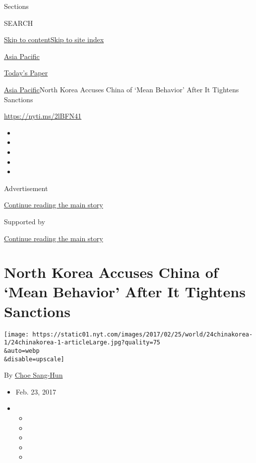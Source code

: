 Sections

SEARCH

\protect\hyperlink{site-content}{Skip to
content}\protect\hyperlink{site-index}{Skip to site index}

\href{https://www.nytimes.com/section/world/asia}{Asia Pacific}

\href{https://myaccount.nytimes.com/auth/login?response_type=cookie\&client_id=vi}{}

\href{https://www.nytimes.com/section/todayspaper}{Today's Paper}

\href{/section/world/asia}{Asia Pacific}\textbar{}North Korea Accuses
China of `Mean Behavior' After It Tightens Sanctions

\url{https://nyti.ms/2lBFN41}

\begin{itemize}
\item
\item
\item
\item
\item
\end{itemize}

Advertisement

\protect\hyperlink{after-top}{Continue reading the main story}

Supported by

\protect\hyperlink{after-sponsor}{Continue reading the main story}

\hypertarget{north-korea-accuses-china-of-mean-behavior-after-it-tightens-sanctions}{%
\section{North Korea Accuses China of `Mean Behavior' After It Tightens
Sanctions}\label{north-korea-accuses-china-of-mean-behavior-after-it-tightens-sanctions}}

\texttt{[image: https://static01.nyt.com/images/2017/02/25/world/24chinakorea-1/24chinakorea-1-articleLarge.jpg?quality=75\\\&auto=webp\\\&disable=upscale]}

By \href{http://www.nytimes.com/by/choe-sang-hun}{Choe Sang-Hun}

\begin{itemize}
\item
  Feb. 23, 2017
\item
  \begin{itemize}
  \item
  \item
  \item
  \item
  \item
  \end{itemize}
\end{itemize}

